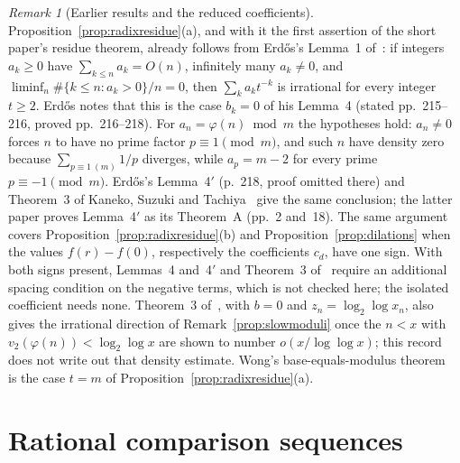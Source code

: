 \documentclass[11pt]{article}
\theoremstyle{plain}
\theoremstyle{definition}
\theoremstyle{remark}
\newtheorem{rem}[thm]{Remark}
\begin{document}
\begin{rem}[Earlier results and the reduced coefficients]
\label{rem:erdos1957}
Proposition~\ref{prop:radixresidue}(a), and with it the first assertion
of the short paper's residue theorem, already follows from Erd\H{o}s's
Lemma~1 of~\cite[p.~213]{erdos1957}: if integers $a_k\ge0$ have
$\sum_{k\le n}a_k=O(n)$, infinitely many $a_k\ne0$, and
$\liminf_n\#\{k\le n:a_k>0\}/n=0$, then $\sum_ka_kt^{-k}$ is irrational for
every integer $t\ge2$. Erd\H{o}s notes that this is the case $b_k=0$ of his
Lemma~4 (stated pp.~215--216, proved pp.~216--218). For
$a_n=\varphi(n)\bmod m$ the hypotheses hold: $a_n\ne0$ forces $n$ to have
no prime factor $p\equiv1\pmod m$, and such $n$ have density zero because
$\sum_{p\equiv1\ (m)}1/p$ diverges, while $a_p=m-2$ for every prime
$p\equiv-1\pmod m$. Erd\H{o}s's Lemma~4$'$ (p.~218, proof omitted there)
and Theorem~3 of Kaneko, Suzuki and Tachiya~\cite[p.~5]{kst2026} give the
same conclusion; the latter paper proves Lemma~4$'$ as its Theorem~A
(pp.~2 and~18). The same argument covers
Proposition~\ref{prop:radixresidue}(b) and Proposition~\ref{prop:dilations}
when the values $f(r)-f(0)$, respectively the coefficients $c_d$, have one
sign. With both signs present, Lemmas~4 and~4$'$ and Theorem~3
of~\cite{kst2026} require an additional spacing condition on the negative
terms, which is not checked here; the isolated coefficient needs none.
Theorem~3 of~\cite{kst2026}, with $b=0$ and $z_n=\log_2\log x_n$, also
gives the irrational direction of Remark~\ref{prop:slowmoduli} once
the $n<x$ with $v_2(\varphi(n))<\log_2\log x$ are shown to number
$o(x/\log\log x)$; this record does not write out that density estimate.
Wong's base-equals-modulus theorem~\cite{wong2015} is the case $t=m$ of
Proposition~\ref{prop:radixresidue}(a).
\end{rem}

\section{Rational comparison sequences}
\label{sec:wall}
\end{document}
